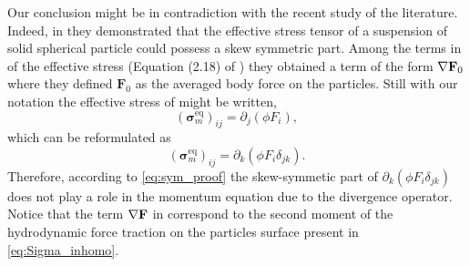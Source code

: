 Our conclusion might be in contradiction with the recent study of the literature. 
Indeed, in \cite{wolgemuth2023continuum} they demonstrated that the effective stress tensor of a suspension of solid spherical particle could possess a skew symmetric part. 
Among the terms in of the effective stress (Equation (2.18) of \cite{wolgemuth2023continuum}) they obtained a term of the form $\mathbf{\nabla} \textbf{F}_0$ where they defined $\textbf{F}_0$ as the averaged body force on the particles. 
Still with our notation the effective stress of \citet{wolgemuth2023continuum} might be written, 
\begin{equation*}
    (\bm\sigma^\text{eq}_m)_{ij}
    = \partial_j(\phi F_i),
\end{equation*}
which can be reformulated as 
\begin{equation*}
    (\bm\sigma^\text{eq}_m)_{ij}
    = \partial_k(\phi F_i \delta_{jk}). 
\end{equation*}
Therefore, according to \ref{eq:sym_proof} the skew-symmetic part of $\partial_k(\phi F_i \delta_{jk})$ does not play a role in the momentum equation due to the divergence operator. 
Notice that the term $\mathbf{\nabla} \textbf{F}$ in \citet{wolgemuth2023continuum} correspond to the second moment of the hydrodynamic force traction on the particles surface present in \ref{eq:Sigma_inhomo}. 


